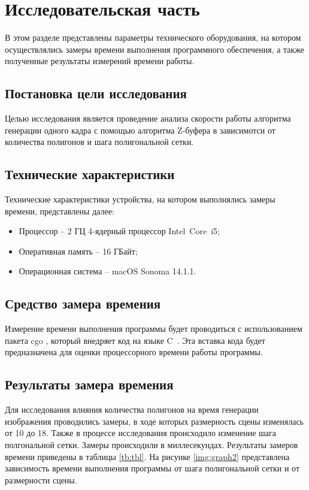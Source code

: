 \chapter{Исследовательская часть}

В этом разделе представлены параметры технического оборудования, на 
котором осуществлялись замеры времени выполнения программного обеспечения, 
а также полученные результаты измерений времени работы.

\section{Постановка цели исследования}

Целью исследования является проведение анализа скорости работы алгоритма генерации одного кадра с помощью алгоритма Z-буфера в 
зависимотси от количества полигонов и шага полигональной сетки.

\section{Технические характеристики}

Технические характеристики устройства, на котором выполнялись замеры времени, представлены далее:

\begin{itemize}
	\item Процессор -- 2 ГЦ 4‑ядерный процессор Intel Core i5;
	\item Оперативная память -- 16 ГБайт;
	\item Операционная система -- macOS Sonoma 14.1.1. 
\end{itemize}

\section{Средство замера времения}

Измерение времени выполнения программы будет проводиться с использованием пакета cgo \cite{cgo}, который внедряет код на языке C~\cite{c}. 
Эта вставка кода будет предназначена для оценки процессорного времени работы программы.

\section{Результаты замера времения}

Для исследования влияния количества полигонов на время генерации изображения проводились замеры, 
в ходе которых размерность сцены изменялась от 10 до 18. Также в процессе исследования происходило изменение шага 
полгональной сетки. Замеры происходили в миллесекундах. Результаты замеров времени приведены в 
таблицы \ref{tb:tbl}. На рисунке \ref{img:graph2} представлена зависимость 
времени выполнения программы от шага полигональной сетки и от размерности сцены.

